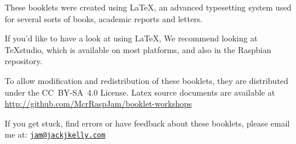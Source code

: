 		\ifprint\else
			These booklets were created using \textrm{\LaTeX}, an advanced typesetting system used for several sorts of books, academic reports and letters.
			
			If you'd like to have a look at using LaTeX, We recommend looking at \TeX studio, which is available on most platforms, and also in the Raspbian repository.
		\fi
		
		
		To allow modification and redistribution of these booklets, they are distributed under the \hbox{CC BY-SA 4.0} License.
		Latex source documents are available at \url{http://github.com/McrRaspJam/booklet-workshops}
		
		If you get stuck, find errors or have feedback about these booklets, please email me at:
		\href{mailto:jam@jackjkelly.com}{\texttt{jam@jackjkelly.com}}